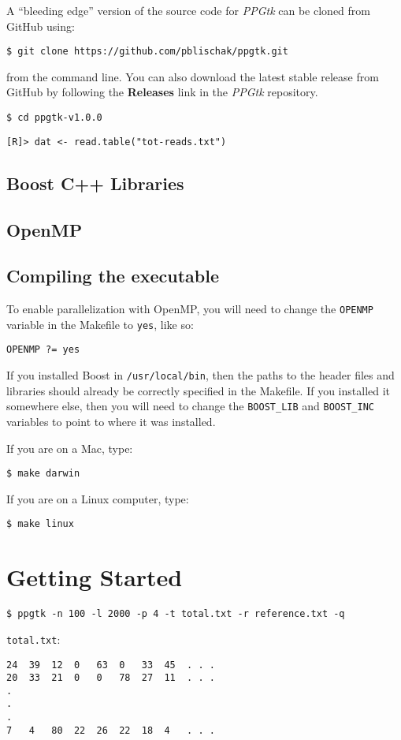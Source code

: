 \documentclass[11pt,english,letterpaper,oneside]{article}
\newcommand{\ppgtk}{\textit{PPGtk}}
\newcommand{\code}[1]{\hspace{15pt} \texttt{#1}}
\begin{document}
A ``bleeding edge'' version of the source code for \ppgtk{} can be cloned from GitHub using:

\code{\$ git clone https://github.com/pblischak/ppgtk.git}

from the command line. You can also download the latest stable release from GitHub by following the \textbf{Releases} link in the \ppgtk{} repository.

\code{\$ cd ppgtk-v1.0.0}

\code{[R]> dat <- read.table("tot-reads.txt")}

\subsection{Boost C++ Libraries}

\citep{boostCPP}

\subsection{OpenMP}

\citep{openMP}

\subsection{Compiling the executable}

To enable parallelization with OpenMP, you will need to change the \texttt{OPENMP} variable in the Makefile to \texttt{yes}, like so:

\code{OPENMP ?= yes}

If you installed Boost in \texttt{/usr/local/bin}, then the paths to the header files and libraries should already be correctly specified in the Makefile. If you installed it somewhere else, then you will need to change the \texttt{BOOST\_LIB} and \texttt{BOOST\_INC} variables to point to where it was installed.

If you are on a Mac, type:

\code{\$ make darwin}

If you are on a Linux computer, type:

\code{\$ make linux}

\section{Getting Started}

\code{\$ ppgtk -n 100 -l 2000 -p 4 -t total.txt -r reference.txt -q}

\texttt{total.txt}:

\begin{verbatim}
24	39	12	0	63	0	33	45	. . .
20	33	21	0	0	78	27	11	. . .
.
.
.
7	4	80	22	26	22	18	4	. . .
\end{verbatim}

\newpage



\end{document}
